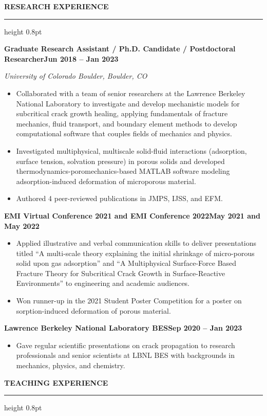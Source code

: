 \documentclass[10pt, letterpaper]{article}
\newcommand{\rsection}[1]{%
  \vspace{8pt}%
  {\large\bfseries\MakeUppercase{#1}}%
  \vspace{1pt}%
  \hrule height 0.8pt%
  \vspace{4pt}%
}
\newcommand{\jobline}[2]{%
  \vspace{5pt}%
  \noindent\textbf{#1}\hfill\textbf{#2}\par%
  \vspace{1pt}%
}
\newcommand{\subline}[1]{%
  \vspace{-1pt}%
  \noindent\textit{#1}\par%
  \vspace{1pt}%
}
\newenvironment{rlist}{%
  \begin{itemize}[leftmargin=1.4em, itemsep=1pt, topsep=2pt, parsep=0pt]%
}{%
  \end{itemize}%
}
\begin{document}
\rsection{Research Experience}

\jobline{Graduate Research Assistant / Ph.D. Candidate / Postdoctoral Researcher}{Jun 2018 -- Jan 2023}
\subline{University of Colorado Boulder, Boulder, CO}
\begin{rlist}
  \item Collaborated with a team of senior researchers at the Lawrence Berkeley National Laboratory to investigate and develop mechanistic models for subcritical crack growth healing, applying fundamentals of fracture mechanics, fluid transport, and boundary element methods to develop computational software that couples fields of mechanics and physics.
  \item Investigated multiphysical, multiscale solid-fluid interactions (adsorption, surface tension, solvation pressure) in porous solids and developed thermodynamics-poromechanics-based MATLAB software modeling adsorption-induced deformation of microporous material.
  \item Authored 4 peer-reviewed publications in JMPS, IJSS, and EFM.
\end{rlist}

\jobline{EMI Virtual Conference 2021 and EMI Conference 2022}{May 2021 and May 2022}
\begin{rlist}
  \item Applied illustrative and verbal communication skills to deliver presentations titled ``A multi-scale theory explaining the initial shrinkage of micro-porous solid upon gas adsorption'' and ``A Multiphysical Surface-Force Based Fracture Theory for Subcritical Crack Growth in Surface-Reactive Environments'' to engineering and academic audiences.
  \item Won runner-up in the 2021 Student Poster Competition for a poster on sorption-induced deformation of porous material.
\end{rlist}

\jobline{Lawrence Berkeley National Laboratory BES}{Sep 2020 -- Jan 2023}
\begin{rlist}
  \item Gave regular scientific presentations on crack propagation to research professionals and senior scientists at LBNL BES with backgrounds in mechanics, physics, and chemistry.
\end{rlist}

\rsection{Teaching Experience}
\end{document}

